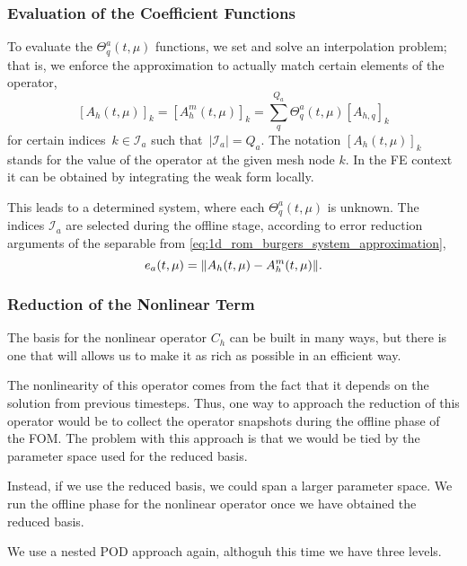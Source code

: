 \documentclass[../../thesis.tex]{subfiles}
\begin{document}
\subsubsection{Evaluation of the Coefficient Functions}
To evaluate the $\Theta_q^a(t, \mu)$ functions, we set and solve an interpolation problem;
that is, 
we enforce the approximation to actually match certain elements of the operator, 
\begin{equation}
    \label{eq:1d_rom_burgers_interpolation_problem}
    [A_h(t, \mu)]_{k} = [A_h^m(t, \mu)]_{k} = \sum_q^{Q_a} \Theta_q^a(t, \mu) [A_{h, q}]_{k}
\end{equation}
for certain indices~$k \in \mathcal{I}_a$ such that~$\left|\mathcal{I}_a\right| = Q_a$.
The notation $[A_h(t, \mu)]_{k}$ stands for the value of the operator at the given mesh node $k$.
In the FE context it can be obtained by integrating the weak form locally.

This leads to a determined system, where each $\Theta_q^a(t, \mu)$ is unknown.
The indices $\mathcal{I}_a$ are selected during the offline stage, 
according to error reduction arguments of the separable from \eqref{eq:1d_rom_burgers_system_approximation},
\begin{equation}
    e_a(t, \mu) = \norm{A_h(t, \mu) - A_h^m(t, \mu)}.
\end{equation}

\subsubsection{Reduction of the Nonlinear Term}
The basis for the nonlinear operator $C_h$ can be built in many ways,
but there is one that will allows us to make it as rich as possible in an efficient
way. 

The nonlinearity of this operator comes from the fact that it depends on the solution 
from previous timesteps. 
Thus, one way to approach the reduction of this operator would be to collect 
the operator snapshots during the offline phase of the FOM.
The problem with this approach is that we would be tied by the parameter space 
used for the reduced basis. 

Instead, if we use the reduced basis, we could span a larger parameter space.
We run the offline phase for the nonlinear operator once we have obtained the 
reduced basis. 

We use a nested POD approach again, althoguh this time we have three levels.
\end{document}
